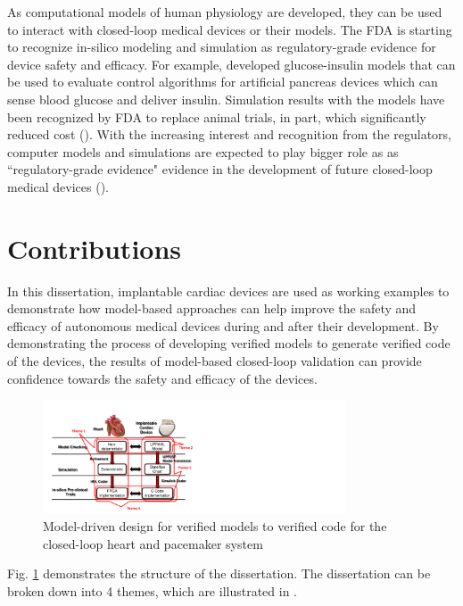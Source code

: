 As computational models of human physiology are developed, they can be used to interact with closed-loop medical devices or their models. 
The FDA is starting to recognize in-silico modeling and simulation as regulatory-grade evidence for device safety and efficacy. 
For example, \cite{pancreas_paul} developed glucose-insulin models that can be used to evaluate control algorithms for artificial pancreas devices which can sense blood glucose and deliver insulin. 
Simulation results with the models have been recognized by FDA to replace animal trials, in part, which significantly reduced cost (\cite{pancreas}). 
With the increasing interest and recognition from the regulators, computer models and simulations are expected to play bigger role as as ``regulatory-grade evidence" evidence in the development of future closed-loop medical devices ().

\section{Contributions}
In this dissertation, implantable cardiac devices are used as working examples to demonstrate how model-based approaches can help improve the safety and efficacy of autonomous medical devices during and after their development. 
By demonstrating the process of developing verified models to generate verified code of the devices, the results of model-based closed-loop validation can provide confidence towards the safety and efficacy of the devices.
\begin{figure}[t]
		\centering
		\includegraphics[width=0.8\textwidth]{figs/model_based_b.pdf}
		\caption{\small Model-driven design for verified models to verified code for the closed-loop heart and pacemaker system}
		\label{fig:modeling_overview}
\end{figure}

Fig. \ref{fig:modeling_overview} demonstrates the structure of the dissertation.
The dissertation can be broken down into 4 themes, which are illustrated in . 

